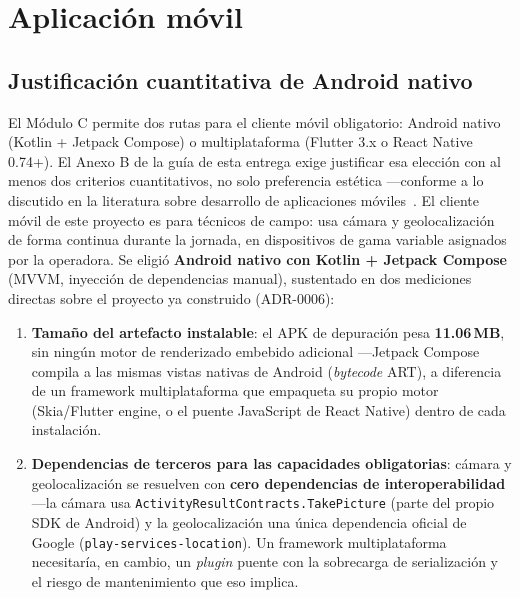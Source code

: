 \section{Aplicación móvil}
\label{sec:movil}

\subsection{Justificación cuantitativa de Android nativo}

El Módulo C permite dos rutas para el cliente móvil obligatorio: Android nativo (Kotlin +
Jetpack Compose) o multiplataforma (Flutter 3.x o React Native 0.74+). El Anexo B de la guía de
esta entrega exige justificar esa elección con al menos dos criterios cuantitativos, no solo
preferencia estética —conforme a lo discutido en la literatura sobre desarrollo de aplicaciones
móviles~\cite{wasserman2010mobile,elkassas2017taxonomy,biornhansen2019crossplatform}. El cliente
móvil de este proyecto es para técnicos de campo: usa cámara y geolocalización de forma continua
durante la jornada, en dispositivos de gama variable asignados por la operadora. Se eligió
\textbf{Android nativo con Kotlin + Jetpack Compose} (MVVM, inyección de dependencias manual),
sustentado en dos mediciones directas sobre el proyecto ya construido (ADR-0006):

\begin{enumerate}[nosep]
  \item \textbf{Tamaño del artefacto instalable}: el APK de depuración pesa \textbf{11.06\,MB},
        sin ningún motor de renderizado embebido adicional —Jetpack Compose compila a las mismas
        vistas nativas de Android (\emph{bytecode} ART), a diferencia de un framework
        multiplataforma que empaqueta su propio motor (Skia/Flutter engine, o el puente
        JavaScript de React Native) dentro de cada instalación.
  \item \textbf{Dependencias de terceros para las capacidades obligatorias}: cámara y
        geolocalización se resuelven con \textbf{cero dependencias de interoperabilidad} —la
        cámara usa \texttt{ActivityResultContracts.TakePicture} (parte del propio SDK de Android)
        y la geolocalización una única dependencia oficial de Google
        (\texttt{play-services-location}). Un framework multiplataforma necesitaría, en cambio,
        un \emph{plugin} puente con la sobrecarga de serialización y el riesgo de mantenimiento
        que eso implica.
\end{enumerate}

